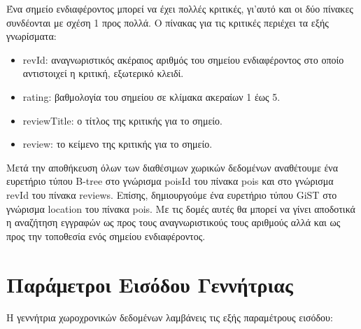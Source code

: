 Ένα σημείο ενδιαφέροντος μπορεί να έχει πολλές κριτικές, γι'αυτό και οι δύο πίνακες συνδέονται με σχέση 1 προς πολλά. Ο πίνακας για τις κριτικές περιέχει τα εξής 
γνωρίσματα:

\begin{itemize}
 \item revId: αναγνωριστικός ακέραιος αριθμός του σημείου ενδιαφέροντος στο οποίο αντιστοιχεί η κριτική, εξωτερικό κλειδί.
 \item rating: βαθμολογία του σημείου σε κλίμακα ακεραίων 1 έως 5.
 \item reviewTitle: ο τίτλος της κριτικής για το σημείο.
 \item review: το κείμενο της κριτικής για το σημείο.
\end{itemize}

Μετά την αποθήκευση όλων των διαθέσιμων χωρικών δεδομένων αναθέτουμε ένα ευρετήριο τύπου B-tree στο γνώρισμα poisId του πίνακα pois και στο γνώρισμα revId του πίνακα 
reviews. Επίσης, δημιουργούμε ένα ευρετήριο τύπου GiST στο γνώρισμα location του πίνακα pois. Με τις δομές αυτές θα μπορεί να γίνει αποδοτικά η αναζήτηση 
εγγραφών ως προς τους αναγνωριστικούς τους αριθμούς αλλά και ως προς την τοποθεσία ενός σημείου ενδιαφέροντος.

\section{Παράμετροι Εισόδου Γεννήτριας}

Η γεννήτρια χωροχρονικών δεδομένων λαμβάνεις τις εξής παραμέτρους εισόδου:

